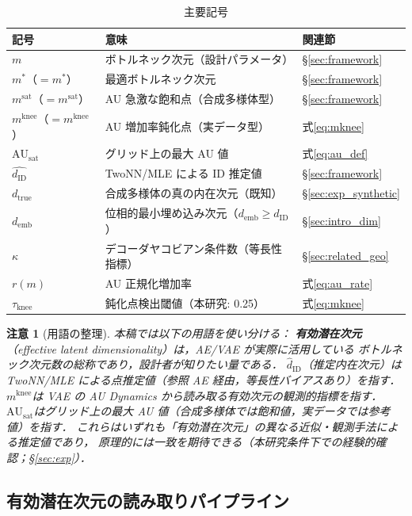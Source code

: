 \documentclass[11pt,a4paper]{jsarticle}
\newtheorem{remark}{注意}
\newcommand{\dID}{d_{\mathrm{ID}}}
\newcommand{\dzopt}{m^*}
\newcommand{\dtrue}{d_{\mathrm{true}}}
\newcommand{\kap}{\kappa}
\newcommand{\AUsat}{\mathrm{AU}_{\mathrm{sat}}}
\newcommand{\dzsat}{m^{\mathrm{sat}}}
\newcommand{\mknee}{m^{\mathrm{knee}}}
\newcommand{\demb}{d_{\mathrm{emb}}}
\begin{document}
\begin{table}[H]
\centering
\caption{主要記号}
\label{tab:notation}
\small
\begin{tabular}{lll}
\toprule
記号 & 意味 & 関連節 \\
\midrule
$m$ & ボトルネック次元（設計パラメータ） & §\ref{sec:framework} \\
$\dzopt$（$= m^*$） & 最適ボトルネック次元 & §\ref{sec:framework} \\
$\dzsat$（$= m^{\mathrm{sat}}$） & AU 急激な飽和点（合成多様体型） & §\ref{sec:framework} \\
$\mknee$（$= m^{\mathrm{knee}}$） & AU 増加率鈍化点（実データ型） & 式\eqref{eq:mknee} \\
$\AUsat$ & グリッド上の最大 AU 値 & 式\eqref{eq:au_def} \\
$\hat{\dID}$ & TwoNN/MLE による ID 推定値 & §\ref{sec:framework} \\
$\dtrue$ & 合成多様体の真の内在次元（既知） & §\ref{sec:exp_synthetic} \\
$\demb$ & 位相的最小埋め込み次元（$\demb \geq \dID$） & §\ref{sec:intro_dim} \\
$\kap$ & デコーダヤコビアン条件数（等長性指標） & §\ref{sec:related_geo} \\
$r(m)$ & AU 正規化増加率 & 式\eqref{eq:au_rate} \\
$\tau_{\mathrm{knee}}$ & 鈍化点検出閾値（本研究: 0.25） & 式\eqref{eq:mknee} \\
\bottomrule
\end{tabular}
\end{table}

\begin{remark}[用語の整理]
本稿では以下の用語を使い分ける：
\textbf{有効潜在次元}（effective latent dimensionality）は，AE/VAE が実際に活用している
ボトルネック次元数の総称であり，設計者が知りたい量である．
\textbf{$\hat{d}_\mathrm{ID}$}（推定内在次元）は TwoNN/MLE による点推定値（参照 AE 経由，等長性バイアスあり）を指す．
\textbf{$\mknee$}は VAE の AU Dynamics から読み取る有効次元の観測的指標を指す．
\textbf{$\AUsat$}はグリッド上の最大 AU 値（合成多様体では飽和値，実データでは参考値）を指す．
これらはいずれも「有効潜在次元」の異なる近似・観測手法による推定値であり，
原理的には一致を期待できる（本研究条件下での経験的確認；§\ref{sec:exp}）．
\end{remark}

\subsection{有効潜在次元の読み取りパイプライン}\label{sec:framework_pipeline}
\end{document}
